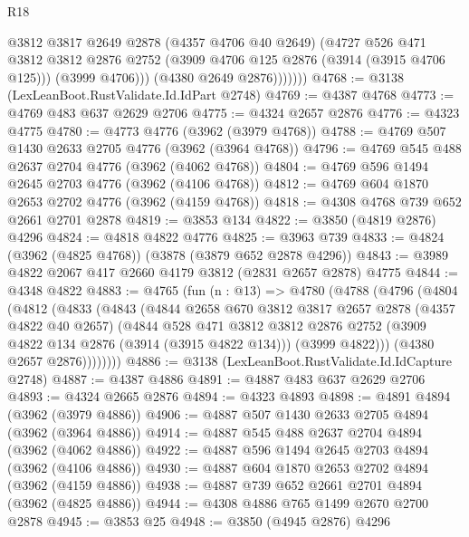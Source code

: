 \begin{lexlean}{R18}
\begin{coremodule}
                  @3812
                  @3817
                  @2649
                  @2878
                  (@4357 @4706 @40 @2649)
                  (@4727
                    @526
                    @471
                    @3812
                    @3812
                    @2876
                    @2752
                    (@3909 @4706 @125 @2876 (@3914 (@3915 @4706 @125)))
                    (@3999 @4706)))
                (@4380 @2649 @2876)))))))
@4768 := @3138 (LexLeanBoot.RustValidate.Id.IdPart @2748)
@4769 := @4387 @4768
@4773 := @4769 @483 @637 @2629 @2706
@4775 := @4324 @2657 @2876
@4776 := @4323 @4775
@4780 := @4773 @4776 (@3962 (@3979 @4768))
@4788 := @4769 @507 @1430 @2633 @2705 @4776 (@3962 (@3964 @4768))
@4796 := @4769 @545 @488 @2637 @2704 @4776 (@3962 (@4062 @4768))
@4804 := @4769 @596 @1494 @2645 @2703 @4776 (@3962 (@4106 @4768))
@4812 := @4769 @604 @1870 @2653 @2702 @4776 (@3962 (@4159 @4768))
@4818 := @4308 @4768 @739 @652 @2661 @2701 @2878
@4819 := @3853 @134
@4822 := @3850 (@4819 @2876) @4296
@4824 := @4818 @4822 @4776
@4825 := @3963 @739
@4833 := @4824 (@3962 (@4825 @4768)) (@3878 (@3879 @652 @2878 @4296))
@4843 := @3989 @4822 @2067 @417 @2660 @4179 @3812 (@2831 @2657 @2878) @4775
@4844 := @4348 @4822
@4883 := @4765
    (fun (n : @13) =>
    @4780
      (@4788
        (@4796
          (@4804
            (@4812
              (@4833
                (@4843
                  (@4844
                    @2658
                    @670
                    @3812
                    @3817
                    @2657
                    @2878
                    (@4357 @4822 @40 @2657)
                    (@4844
                      @528
                      @471
                      @3812
                      @3812
                      @2876
                      @2752
                      (@3909 @4822 @134 @2876 (@3914 (@3915 @4822 @134)))
                      (@3999 @4822)))
                  (@4380 @2657 @2876))))))))
@4886 := @3138 (LexLeanBoot.RustValidate.Id.IdCapture @2748)
@4887 := @4387 @4886
@4891 := @4887 @483 @637 @2629 @2706
@4893 := @4324 @2665 @2876
@4894 := @4323 @4893
@4898 := @4891 @4894 (@3962 (@3979 @4886))
@4906 := @4887 @507 @1430 @2633 @2705 @4894 (@3962 (@3964 @4886))
@4914 := @4887 @545 @488 @2637 @2704 @4894 (@3962 (@4062 @4886))
@4922 := @4887 @596 @1494 @2645 @2703 @4894 (@3962 (@4106 @4886))
@4930 := @4887 @604 @1870 @2653 @2702 @4894 (@3962 (@4159 @4886))
@4938 := @4887 @739 @652 @2661 @2701 @4894 (@3962 (@4825 @4886))
@4944 := @4308 @4886 @765 @1499 @2670 @2700 @2878
@4945 := @3853 @25
@4948 := @3850 (@4945 @2876) @4296

\end{coremodule}
\end{lexlean}
